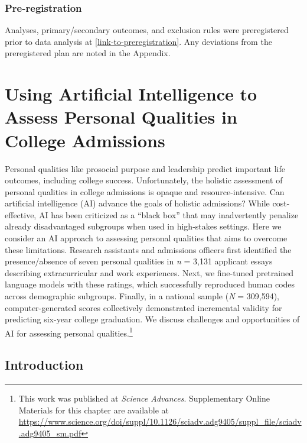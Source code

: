 \documentclass[11pt]{report}
\begin{document}
\begin{mainf}
\subsection{Pre-registration}
Analyses, primary/secondary outcomes, and exclusion rules were preregistered prior to data analysis at \url{[link-to-preregistration]}.
Any deviations from the preregistered plan are noted in the Appendix.


\chapter{Using Artificial Intelligence to Assess Personal Qualities in College Admissions}

Personal qualities like prosocial purpose and leadership predict important life outcomes, including college success. Unfortunately, the holistic assessment of personal qualities in college admissions is opaque and resource-intensive. Can artificial intelligence (AI) advance the goals of holistic admissions? While cost-effective, AI has been criticized as a “black box” that may inadvertently penalize already disadvantaged subgroups when used in high-stakes settings. Here we consider an AI approach to assessing personal qualities that aims to overcome these limitations. Research assistants and admissions officers first identified the presence/absence of seven personal qualities in \textit{n} = 3,131 applicant essays describing extracurricular and work experiences. Next, we fine-tuned pretrained language models with these ratings, which successfully reproduced human codes across demographic subgroups. Finally, in a national sample (\textit{N} = 309,594), computer-generated scores collectively demonstrated incremental validity for predicting six-year college graduation. We discuss challenges and opportunities of AI for assessing personal qualities.\footnote{This work was published at \textit{Science Advances}. Supplementary Online Materials for this chapter are available at \url{https://www.science.org/doi/suppl/10.1126/sciadv.adg9405/suppl_file/sciadv.adg9405_sm.pdf}}


\section{Introduction}


\end{mainf}
\end{document}
